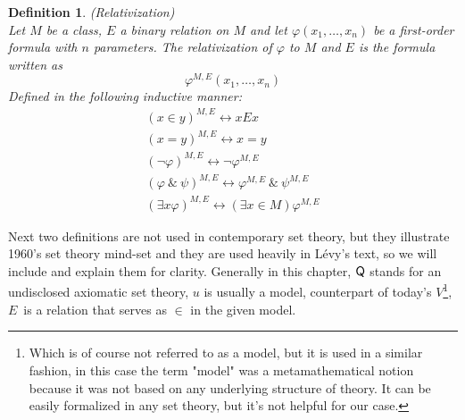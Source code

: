 \documentclass[12pt,a4paper]{article}
\newtheorem{definition}[theorem]{Definition}
\renewcommand{\iff}{\leftrightarrow}
\begin{document}
\begin{definition}{(Relativization)}\label{def:relativization}\cite[Definition 12.6]{JechBook}\\ 
Let $M$ be a class, $E$ a binary relation on $M$ and let $\varphi(x_1, \ldots, x_n)$ be a first-order formula with $n$ parameters. The relativization of $\varphi$ to $M$ and $E$ is the formula written as
\begin{equation}
\varphi^{M, E}(x_1, \ldots, x_n)
\end{equation}
Defined in the following inductive manner:
\begin{equation}
\begin{gathered}
(x \in y)^{M,E} \iff x E x\\
(x = y)^{M,E} \iff x = y\\
(\neg \varphi)^{M,E} \iff \neg \varphi^{M,E}\\
(\varphi\ \&\ \psi)^{M,E} \iff \varphi^{M,E}\ \&\ \psi^{M,E}\\
(\exists x\varphi)^{M,E} \iff (\exists x \in M) \varphi^{M,E}
\end{gathered}
\end{equation}
\end{definition}

Next two definitions are not used in contemporary set theory, but they illustrate 1960's set theory mind-set and they are used heavily in Lévy's text, so we will include and explain them for clarity. Generally in this chapter, $\sf{Q}$ stands for an undisclosed axiomatic set theory, $u$ is usually a model, counterpart of today's $V$\footnote{Which is of course not referred to as a model, but it is used in a similar fashion, in this case the term "model" was a metamathematical notion because it was not based on any underlying structure of theory. It can be easily formalized in any set theory, but it's not helpful for our case.}, $E$ is a relation that serves as $\in$ in the given model.
\end{document}
